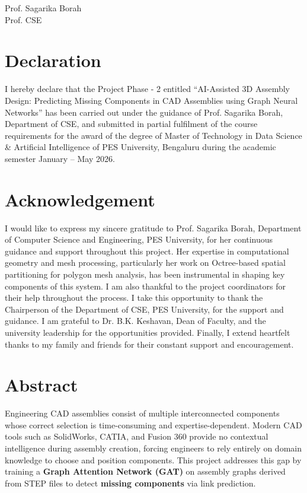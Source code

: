 \documentclass[12pt]{report}
\begin{document}
\vspace{2cm}

\begin{flushright}
Prof. Sagarika Borah\\
Prof. CSE
\end{flushright}

\newpage

\section*{Declaration}

I hereby declare that the Project Phase - 2 entitled ``AI-Assisted 3D Assembly Design: Predicting Missing Components in CAD Assemblies using Graph Neural Networks'' has been carried out under the guidance of Prof. Sagarika Borah, Department of CSE, and submitted in partial fulfilment of the course requirements for the award of the degree of Master of Technology in Data Science \& Artificial Intelligence of PES University, Bengaluru during the academic semester January -- May 2026.

\newpage

\section*{Acknowledgement}

I would like to express my sincere gratitude to Prof. Sagarika Borah, Department of Computer Science and Engineering, PES University, for her continuous guidance and support throughout this project. Her expertise in computational geometry and mesh processing, particularly her work on Octree-based spatial partitioning for polygon mesh analysis, has been instrumental in shaping key components of this system. I am also thankful to the project coordinators for their help throughout the process. I take this opportunity to thank the Chairperson of the Department of CSE, PES University, for the support and guidance. I am grateful to Dr. B.K. Keshavan, Dean of Faculty, and the university leadership for the opportunities provided. Finally, I extend heartfelt thanks to my family and friends for their constant support and encouragement.

\newpage

\section*{Abstract}

Engineering CAD assemblies consist of multiple interconnected components whose correct selection is time-consuming and expertise-dependent. Modern CAD tools such as SolidWorks, CATIA, and Fusion 360 provide no contextual intelligence during assembly creation, forcing engineers to rely entirely on domain knowledge to choose and position components. This project addresses this gap by training a \textbf{Graph Attention Network (GAT)} on assembly graphs derived from STEP files to detect \textbf{missing components} via link prediction.
\end{document}
